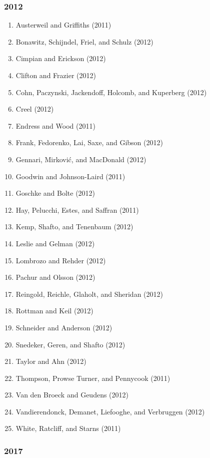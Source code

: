 \documentclass[english,man]{apa6}
\providecommand{\tightlist}{%
  \setlength{\itemsep}{0pt}\setlength{\parskip}{0pt}}
\theoremstyle{definition}
\theoremstyle{definition}
\theoremstyle{definition}
\theoremstyle{remark}
\begin{document}
\subsubsection{2012}\label{section-4}

\begin{enumerate}
\def\labelenumi{\arabic{enumi})}
\tightlist
\item
  Austerweil and Griffiths (2011)
\item
  Bonawitz, Schijndel, Friel, and Schulz (2012)
\item
  Cimpian and Erickson (2012)
\item
  Clifton and Frazier (2012)
\item
  Cohn, Paczynski, Jackendoff, Holcomb, and Kuperberg (2012)
\item
  Creel (2012)
\item
  Endress and Wood (2011)
\item
  Frank, Fedorenko, Lai, Saxe, and Gibson (2012)
\item
  Gennari, Mirković, and MacDonald (2012)
\item
  Goodwin and Johnson-Laird (2011)
\item
  Goschke and Bolte (2012)
\item
  Hay, Pelucchi, Estes, and Saffran (2011)
\item
  Kemp, Shafto, and Tenenbaum (2012)
\item
  Leslie and Gelman (2012)
\item
  Lombrozo and Rehder (2012)
\item
  Pachur and Olsson (2012)
\item
  Reingold, Reichle, Glaholt, and Sheridan (2012)
\item
  Rottman and Keil (2012)
\item
  Schneider and Anderson (2012)
\item
  Snedeker, Geren, and Shafto (2012)
\item
  Taylor and Ahn (2012)
\item
  Thompson, Prowse Turner, and Pennycook (2011)
\item
  Van den Broeck and Geudens (2012)
\item
  Vandierendonck, Demanet, Liefooghe, and Verbruggen (2012)
\item
  White, Ratcliff, and Starns (2011)
\end{enumerate}

\subsubsection{2017}\label{section-5}
\end{document}
